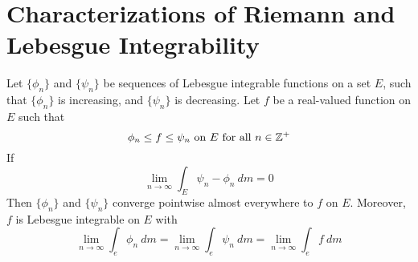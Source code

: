 \section{Characterizations of Riemann and Lebesgue Integrability}

\begin{lemma}\label{10.7.1}
    Let $\{\phi_n\}$ and $\{\psi_n\}$ be sequences of Lebesgue integrable
    functions on a set $E$, such that  $\{\phi_n\}$ is increasing, and $\{\psi_n\}$
    is decreasing. Let $f$ be a real-valued function on $E$ such that
    \begin{equation*}
        \phi_n \leq f \leq \psi_n \text{ on } E \text{ for all } n \in \mathbb{Z}^+
    \end{equation*}
    If
    \begin{equation*}
        \lim_{n \xrightarrow{} \infty}{\int_E{\psi_n-\phi_n \ dm}}=0
    \end{equation*}
    Then $\{\phi_n\}$ and $\{\psi_n\}$ converge pointwise almost everywhere to
    $f$ on  $E$. Moreover,  $f$ is Lebesgue integrable on  $E$ with
    \begin{equation*}
        \lim_{n \xrightarrow{} \infty}{\int_e{\phi_n \ dm}}=
        \lim_{n \xrightarrow{} \infty}{\int_e{\psi_n \ dm}}=
        \lim_{n \xrightarrow{} \infty}{\int_e{f \ dm}}
    \end{equation*}
\end{lemma}
